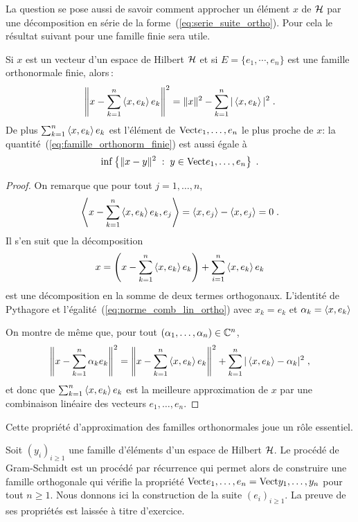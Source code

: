La question se pose aussi de savoir comment approcher un \'{e}l\'{e}ment $x$ de $\mathcal{H}$
par une d\'{e}composition en s\'{e}rie de la forme~(\ref{eq:serie_suite_ortho}).
Pour cela le r\'{e}sultat suivant pour une famille finie sera utile.
\begin{proposition}
\label{prop:bessel}
Si $x$ est un vecteur d'un espace de Hilbert $\mathcal{H}$ et si
$E=\{e_1,\cdots,e_n\}$ est une famille orthonormale finie, alors\,:
\begin{equation}
  \label{eq:famille_orthonorm_finie}
\left\| x-\sum_{k=1}^n \left\langle x, e_k \right\rangle e_k \right\|^2= \|x\|^2 - \sum_{k=1}^n |\left\langle x, e_k \right\rangle|^2\;.
\end{equation}
De plus
$\sum_{k=1}^n \left\langle x, e_k \right\rangle e_k$ est l'\'{e}l\'{e}ment de
$\mathrm{Vect}{e_1,\dots,e_n}$ le plus proche de $x$: la
quantit\'{e}~(\ref{eq:famille_orthonorm_finie}) est aussi \'{e}gale \`{a}
$$
\inf\left\{\|x-y\|^2 \;:\;y \in\mathrm{Vect}{e_1,\dots,e_n}\right\}\;.
$$
\end{proposition}
\begin{proof}\smartqed
On remarque que pour tout $j=1,\dots,n$,
$$
\left\langle x-\sum_{k=1}^n \left\langle x, e_k \right\rangle e_k, e_j \right\rangle=\left\langle x, e_j \right\rangle-\left\langle x, e_j \right\rangle=0\;.
$$
Il s'en suit que la d\'{e}composition
$$
x=\left(x-\sum_{k=1}^n \left\langle x, e_k \right\rangle e_k\right)+\sum_{i=1}^n \left\langle x, e_k \right\rangle e_k
$$
est une d\'{e}composition en la somme de deux termes orthogonaux. L'identit\'{e} de
Pythagore et l'\'{e}galit\'{e}~(\ref{eq:norme_comb_lin_ortho}) avec $x_k=e_k$ et
$\alpha_k=\left\langle x, e_k \right\rangle$

On montre de m\^{e}me que, pour tout  $(\alpha_1,\dots,\alpha_n) \in \mathbb{C}^n$,
$$
\left\| x - \sum_{k=1}^n \alpha_k e_k \right\|^2=
\left\| x - \sum_{k=1}^n \left\langle x, e_k \right\rangle e_k \right\|^2 +
\sum_{k=1}^n |\left\langle x, e_k \right\rangle-\alpha_k|^2\;,
$$
et donc que $\sum_{k=1}^n \left\langle x, e_k \right\rangle e_k$ est la meilleure approximation de
$x$ par une combinaison lin\'{e}aire des vecteurs $e_1,\dots,e_n$.

\end{proof}
Cette propri\'{e}t\'{e}
d'approximation des familles orthonormales joue un r\^{o}le essentiel.
\begin{example}
\label{exple:gram-schmidt}
Soit $(y_i)_{i\geq1}$ une famille d'\'{e}l\'{e}ments d'un espace de Hilbert $\mathcal{H}$.
Le proc\'{e}d\'{e} de Gram-Schmidt est un proc\'{e}d\'{e} par r\'{e}currence qui permet alors de
construire une famille orthogonale
 qui v\'{e}rifie la propri\'{e}t\'{e}
$\mathrm{Vect}{e_1,\dots,e_n}=\mathrm{Vect}{y_1,\dots,y_n}$ pour tout $n\geq1$.
Nous donnons ici la construction de la suite $(e_i)_{i\geq1}$. La preuve de ses
propri\'{e}t\'{e}s est laiss\'{e}e \`{a} titre d'exercice.
\end{example}

